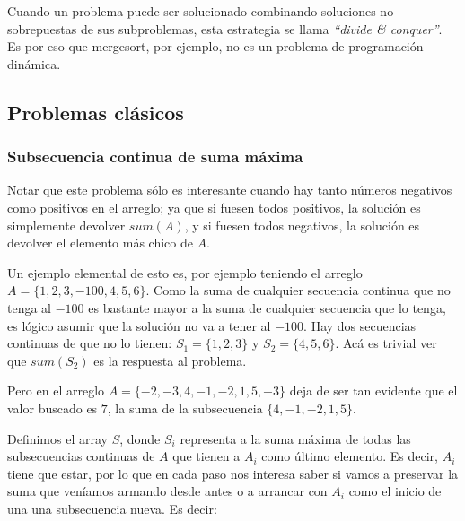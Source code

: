 Cuando un problema puede ser solucionado combinando soluciones no sobrepuestas de sus subproblemas, esta estrategia se llama \emph{``divide \& conquer''}. Es por eso que mergesort, por ejemplo, no es un problema de programaci\'on din\'amica.

\newpage
\subsection{Problemas cl\'asicos}

\subsubsection{Subsecuencia continua de suma m\'axima}


\noindent{}

Notar que este problema s\'olo es interesante cuando hay tanto n\'umeros negativos como positivos en el arreglo; ya que si fuesen todos positivos, la soluci\'on es simplemente devolver $sum(A)$, y si fuesen todos negativos, la soluci\'on es devolver el elemento m\'as chico de $A$.

Un ejemplo elemental de esto es, por ejemplo teniendo el arreglo $A = \{ 1, 2, 3, -100, 4, 5, 6\}$. Como la suma de cualquier secuencia continua que no tenga al $-100$ es bastante mayor a la suma de cualquier secuencia que lo tenga, es l\'ogico asumir que la soluci\'on no va a tener al $-100$. Hay dos secuencias continuas de que no lo tienen: $S_1 = \{ 1, 2, 3\}$ y $S_2 = \{ 4, 5, 6\}$. Ac\'a es trivial ver que $sum(S_2)$ es la respuesta al problema.

Pero en el arreglo $A = \{-2, -3, 4, -1, -2, 1, 5, -3\}$ deja de ser tan evidente que el valor buscado es $7$, la suma de la subsecuencia $\{4, -1, -2, 1, 5\}$.

Definimos el array $S$, donde $S_i$ representa a la suma m\'axima de todas las subsecuencias continuas de $A$ que tienen a $A_i$ como \'ultimo elemento. Es decir, $A_i$ tiene que estar, por lo que en cada paso nos interesa saber si vamos a preservar la suma que ven\'iamos armando desde antes o a arrancar con $A_i$ como el inicio de una una subsecuencia nueva. Es decir:

